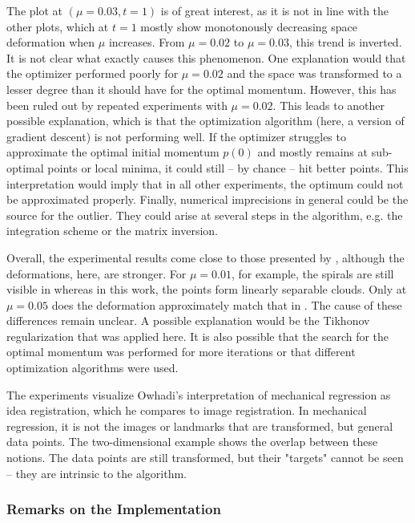 The plot at $(\mu=0.03, t=1)$ is of great interest, as it is not in line with the other plots, which at $t=1$ mostly show monotonously decreasing space deformation when $\mu$ increases.
From $\mu = 0.02$ to $\mu = 0.03$, this trend is inverted.
It is not clear what exactly causes this phenomenon.
One explanation would that the optimizer performed poorly for $\mu=0.02$ and the space was transformed to a lesser degree than it should have for the optimal momentum.
However, this has been ruled out by repeated experiments with $\mu = 0.02$.
This leads to another possible explanation, which is that the optimization algorithm (here, a version of gradient descent) is not performing well.
If the optimizer struggles to approximate the optimal initial momentum $p(0)$ and mostly remains at sub-optimal points or local minima, it could still -- by chance -- hit better points.
This interpretation would imply that in all other experiments, the optimum could not be approximated properly.
Finally, numerical imprecisions in general could be the source for the outlier.
They could arise at several steps in the algorithm, e.g. the integration scheme or the matrix inversion.

Overall, the experimental results come close to those presented by \citet{owhadi20}, although the deformations, here, are stronger.
For $\mu = 0.01$, for example, the spirals are still visible in \cite{owhadi20} whereas in this work, the points form linearly separable clouds.
Only at $\mu = 0.05$ does the deformation approximately match that in \cite{owhadi20}.
The cause of these differences remain unclear.
A possible explanation would be the Tikhonov regularization that was applied here.
It is also possible that the search for the optimal momentum was performed for more iterations or that different optimization algorithms were used.

The experiments visualize Owhadi's \cite{owhadi20} interpretation of mechanical regression as idea registration, which he compares to image registration.
In mechanical regression, it is not the images or landmarks that are transformed, but general data points.
The two-dimensional example shows the overlap between these notions.
The data points are still transformed, but their "targets" cannot be seen -- they are intrinsic to the algorithm.

\subsubsection{Remarks on the Implementation}

